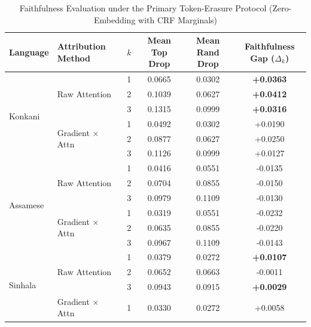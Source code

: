 \documentclass[pdflatex,sn-mathphys-num]{sn-jnl}
\begin{document}
\begin{table}[htbp]
\centering
\caption{Faithfulness Evaluation under the Primary Token-Erasure Protocol (Zero-Embedding with CRF Marginals)}
\label{tab:faithfulness_results}
\footnotesize
\setlength{\tabcolsep}{4.5pt}
\begin{tabular}{llcccc}
\toprule
\textbf{Language} & \textbf{Attribution Method} & \textbf{$k$} & \textbf{Mean Top Drop} & \textbf{Mean Rand Drop} & \textbf{Faithfulness Gap ($\Delta_k$)} \\
\midrule
\multirow{6}{*}{Konkani}  & \multirow{3}{*}{Raw Attention} 
                            & 1 & 0.0665 & 0.0302 & \textbf{+0.0363} \\
                          & & 2 & 0.1039 & 0.0627 & \textbf{+0.0412} \\
                          & & 3 & 0.1315 & 0.0999 & \textbf{+0.0316} \\
\cmidrule{2-6}
                          & \multirow{3}{*}{Gradient $\times$ Attn} 
                            & 1 & 0.0492 & 0.0302 & +0.0190 \\
                          & & 2 & 0.0877 & 0.0627 & +0.0250 \\
                          & & 3 & 0.1126 & 0.0999 & +0.0127 \\
\midrule
\multirow{6}{*}{Assamese} & \multirow{3}{*}{Raw Attention} 
                            & 1 & 0.0416 & 0.0551 & -0.0135 \\
                          & & 2 & 0.0704 & 0.0855 & -0.0150 \\
                          & & 3 & 0.0979 & 0.1109 & -0.0130 \\
\cmidrule{2-6}
                          & \multirow{3}{*}{Gradient $\times$ Attn} 
                            & 1 & 0.0319 & 0.0551 & -0.0232 \\
                          & & 2 & 0.0635 & 0.0855 & -0.0220 \\
                          & & 3 & 0.0967 & 0.1109 & -0.0143 \\
\midrule
\multirow{6}{*}{Sinhala}  & \multirow{3}{*}{Raw Attention} 
                            & 1 & 0.0379 & 0.0272 & \textbf{+0.0107} \\
                          & & 2 & 0.0652 & 0.0663 & -0.0011 \\
                          & & 3 & 0.0943 & 0.0915 & \textbf{+0.0029} \\
\cmidrule{2-6}
                          & \multirow{3}{*}{Gradient $\times$ Attn} 
                            & 1 & 0.0330 & 0.0272 & +0.0058 \\

\end{tabular}
\end{table}
\end{document}
